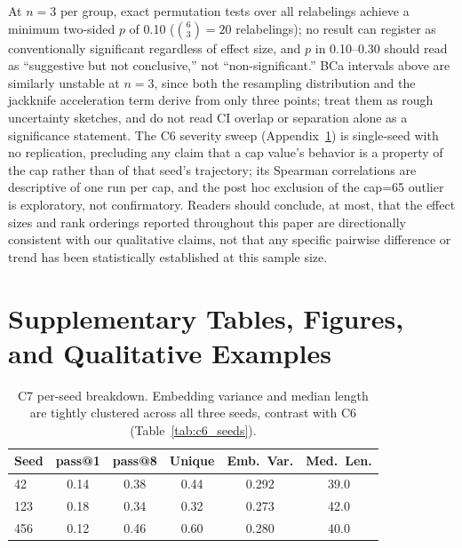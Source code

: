 \documentclass{article}
\begin{document}
At $n=3$ per group, exact permutation tests over all relabelings achieve a minimum two-sided $p$ of 0.10 ($\binom{6}{3}=20$ relabelings); no result can register as conventionally significant regardless of effect size, and $p$ in 0.10--0.30 should read as ``suggestive but not conclusive,'' not ``non-significant.'' BCa intervals above are similarly unstable at $n=3$, since both the resampling distribution and the jackknife acceleration term derive from only three points; treat them as rough uncertainty sketches, and do not read CI overlap or separation alone as a significance statement. The C6 severity sweep (Appendix~\ref{app:supp}) is single-seed with no replication, precluding any claim that a cap value's behavior is a property of the cap rather than of that seed's trajectory; its Spearman correlations are descriptive of one run per cap, and the post hoc exclusion of the cap=65 outlier is exploratory, not confirmatory. Readers should conclude, at most, that the effect sizes and rank orderings reported throughout this paper are directionally consistent with our qualitative claims, not that any specific pairwise difference or trend has been statistically established at this sample size.

\section{Supplementary Tables, Figures, and Qualitative Examples}
\label{app:supp}

\begin{table}[h]
\centering
\caption{C7 per-seed breakdown. Embedding variance and median length are tightly clustered across all three seeds, contrast with C6 (Table~\ref{tab:c6_seeds}).}
\label{tab:c7_seeds}
\small
\begin{tabular}{lccccc}
\toprule
\textbf{Seed} & \textbf{pass@1} & \textbf{pass@8} & \textbf{Unique} & \textbf{Emb.\ Var.} & \textbf{Med.\ Len.} \\
\midrule
42  & 0.14 & 0.38 & 0.44 & 0.292 & 39.0 \\
123 & 0.18 & 0.34 & 0.32 & 0.273 & 42.0 \\
456 & 0.12 & 0.46 & 0.60 & 0.280 & 40.0 \\
\bottomrule
\end{tabular}
\end{table}
\end{document}
